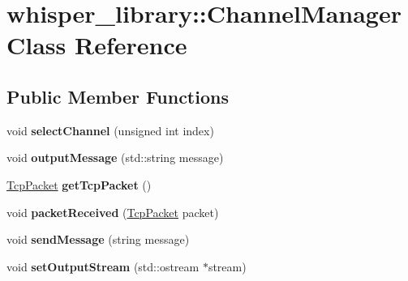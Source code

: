\hypertarget{classwhisper__library_1_1ChannelManager}{\section{whisper\-\_\-library\-:\-:\-Channel\-Manager \-Class \-Reference}
\label{classwhisper__library_1_1ChannelManager}
}
\subsection*{\-Public \-Member \-Functions}
\begin{DoxyCompactItemize}
\item 
\hypertarget{classwhisper__library_1_1ChannelManager_a0b261a0299cf60341fd2ce2754eb5fa5}{void {\bfseries select\-Channel} (unsigned int index)}\label{classwhisper__library_1_1ChannelManager_a0b261a0299cf60341fd2ce2754eb5fa5}

\item 
\hypertarget{classwhisper__library_1_1ChannelManager_a530082678849bf48b11be67c8d137e22}{void {\bfseries output\-Message} (std\-::string message)}\label{classwhisper__library_1_1ChannelManager_a530082678849bf48b11be67c8d137e22}

\item 
\hypertarget{classwhisper__library_1_1ChannelManager_a7375561a1bbf24c418a86e76828110ff}{\hyperlink{classwhisper__library_1_1TcpPacket}{\-Tcp\-Packet} {\bfseries get\-Tcp\-Packet} ()}\label{classwhisper__library_1_1ChannelManager_a7375561a1bbf24c418a86e76828110ff}

\item 
\hypertarget{classwhisper__library_1_1ChannelManager_ac0e320bbc7593d3f3972472f90a60820}{void {\bfseries packet\-Received} (\hyperlink{classwhisper__library_1_1TcpPacket}{\-Tcp\-Packet} packet)}\label{classwhisper__library_1_1ChannelManager_ac0e320bbc7593d3f3972472f90a60820}

\item 
\hypertarget{classwhisper__library_1_1ChannelManager_a33b7963e32e883de361584f9468ae67f}{void {\bfseries send\-Message} (string message)}\label{classwhisper__library_1_1ChannelManager_a33b7963e32e883de361584f9468ae67f}

\item 
\hypertarget{classwhisper__library_1_1ChannelManager_a3e45c6a98f22336ab4481395f9007517}{void {\bfseries set\-Output\-Stream} (std\-::ostream $\ast$stream)}\label{classwhisper__library_1_1ChannelManager_a3e45c6a98f22336ab4481395f9007517}


\end{DoxyCompactItemize}
